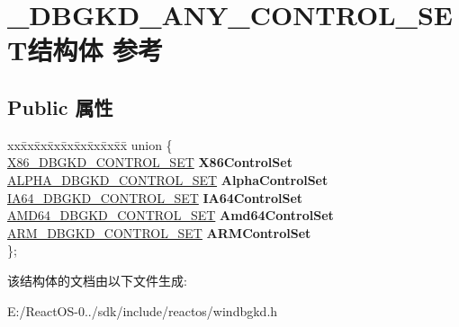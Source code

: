 \hypertarget{struct___d_b_g_k_d___a_n_y___c_o_n_t_r_o_l___s_e_t}{}\section{\+\_\+\+D\+B\+G\+K\+D\+\_\+\+A\+N\+Y\+\_\+\+C\+O\+N\+T\+R\+O\+L\+\_\+\+S\+E\+T结构体 参考}
\label{struct___d_b_g_k_d___a_n_y___c_o_n_t_r_o_l___s_e_t}
\subsection*{Public 属性}
\begin{DoxyCompactItemize}
\item 
\mbox{\label{struct___d_b_g_k_d___a_n_y___c_o_n_t_r_o_l___s_e_t_a8e5b3e3b48bc6d0f72e4e00c2617abdb}} 
\begin{tabbing}
xx\=xx\=xx\=xx\=xx\=xx\=xx\=xx\=xx\=\kill
union \{\\
\>\hyperlink{struct___x86___d_b_g_k_d___c_o_n_t_r_o_l___s_e_t}{X86\_DBGKD\_CONTROL\_SET} {\bfseries X86ControlSet}\\
\>\hyperlink{struct___a_l_p_h_a___d_b_g_k_d___c_o_n_t_r_o_l___s_e_t}{ALPHA\_DBGKD\_CONTROL\_SET} {\bfseries AlphaControlSet}\\
\>\hyperlink{struct___i_a64___d_b_g_k_d___c_o_n_t_r_o_l___s_e_t}{IA64\_DBGKD\_CONTROL\_SET} {\bfseries IA64ControlSet}\\
\>\hyperlink{struct___a_m_d64___d_b_g_k_d___c_o_n_t_r_o_l___s_e_t}{AMD64\_DBGKD\_CONTROL\_SET} {\bfseries Amd64ControlSet}\\
\>\hyperlink{struct___a_r_m___d_b_g_k_d___c_o_n_t_r_o_l___s_e_t}{ARM\_DBGKD\_CONTROL\_SET} {\bfseries ARMControlSet}\\
\}; \\

\end{tabbing}\end{DoxyCompactItemize}


该结构体的文档由以下文件生成\+:\begin{DoxyCompactItemize}
\item 
E\+:/\+React\+O\+S-\/0../sdk/include/reactos/windbgkd.\+h\end{DoxyCompactItemize}
